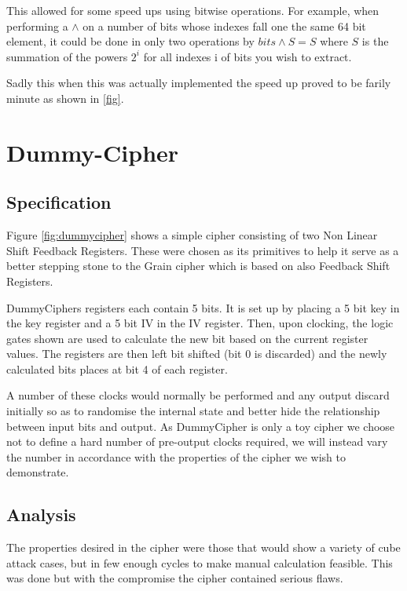 \documentclass{report}
\let\Oldsection\section
\renewcommand{\section}{\FloatBarrier\Oldsection}
\let\Oldsubsection\subsection
\renewcommand{\subsection}{\FloatBarrier\Oldsubsection}
\begin{document}
This allowed for some speed ups using bitwise operations. For example, when performing a $\land$ on a number of bits whose indexes fall one the same 64 bit element, it could be done in only two operations by $bits \land S = S$ where $S$ is the summation of the powers $2^i$ for all indexes i of bits you wish to extract.

Sadly this when this was actually implemented the speed up proved to be farily minute as shown in \ref{fig}.

\newpage
\section{Dummy-Cipher}
\begin{figure}[!htb]
\end{figure}
\subsection{Specification}
Figure \ref{fig:dummycipher} shows a simple cipher consisting of two Non Linear Shift Feedback Registers. These were chosen as its primitives to help it serve as a better stepping stone to the Grain cipher which is based on also Feedback Shift Registers.

DummyCiphers registers each contain 5 bits. It is set up by placing a 5 bit key in the key register and a 5 bit IV in the IV register. Then, upon clocking, the logic gates shown are used to calculate the new bit based on the current register values. The registers are then left bit shifted (bit 0 is discarded) and the newly calculated bits places at bit 4 of each register.

A number of these clocks would normally be performed and any output discard initially so as to randomise the internal state and better hide the relationship between input bits and output. As DummyCipher is only a toy cipher we choose not to define a hard number of pre-output clocks required, we will instead vary the number in accordance with the properties of the cipher we wish to demonstrate.

\subsection{Analysis}

The properties desired in the cipher were those that would show a variety of cube attack cases, but in few enough cycles to make manual calculation feasible. This was done but with the compromise the cipher contained serious flaws.
\end{document}

